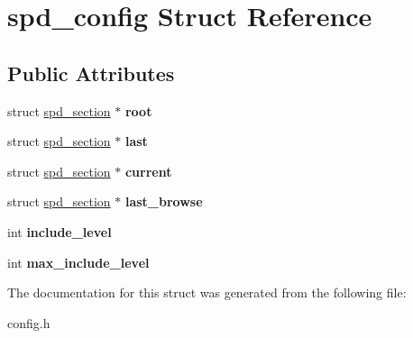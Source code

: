 \hypertarget{structspd__config}{
\section{spd\_\-config Struct Reference}
\label{structspd__config}
}
\subsection*{Public Attributes}
\begin{DoxyCompactItemize}
\item 
\hypertarget{structspd__config_a52f7dceefe16dad867d0c6cdb04227ab}{
struct \hyperlink{structspd__section}{spd\_\-section} $\ast$ {\bfseries root}}
\label{structspd__config_a52f7dceefe16dad867d0c6cdb04227ab}

\item 
\hypertarget{structspd__config_a3a990e539aaa1e160cc7f4881e44d56b}{
struct \hyperlink{structspd__section}{spd\_\-section} $\ast$ {\bfseries last}}
\label{structspd__config_a3a990e539aaa1e160cc7f4881e44d56b}

\item 
\hypertarget{structspd__config_ab3d535743f5f17c289591aceedaa919b}{
struct \hyperlink{structspd__section}{spd\_\-section} $\ast$ {\bfseries current}}
\label{structspd__config_ab3d535743f5f17c289591aceedaa919b}

\item 
\hypertarget{structspd__config_ac025e64d470627ec6d01258b5f94aec5}{
struct \hyperlink{structspd__section}{spd\_\-section} $\ast$ {\bfseries last\_\-browse}}
\label{structspd__config_ac025e64d470627ec6d01258b5f94aec5}

\item 
\hypertarget{structspd__config_a842dac7e0652ec690b3dbe2a3cf1f72a}{
int {\bfseries include\_\-level}}
\label{structspd__config_a842dac7e0652ec690b3dbe2a3cf1f72a}

\item 
\hypertarget{structspd__config_a5ae5874093b7f2794cc5ae35c0edafb4}{
int {\bfseries max\_\-include\_\-level}}
\label{structspd__config_a5ae5874093b7f2794cc5ae35c0edafb4}

\end{DoxyCompactItemize}


The documentation for this struct was generated from the following file:\begin{DoxyCompactItemize}
\item 
config.h\end{DoxyCompactItemize}
